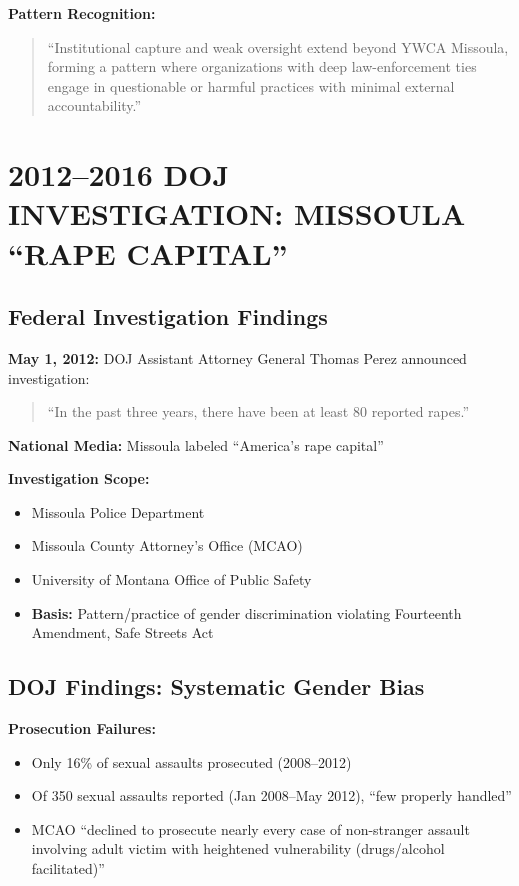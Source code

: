 \documentclass[11pt,letterpaper]{article}
\begin{document}
\textbf{Pattern Recognition:}
\begin{quote}
``Institutional capture and weak oversight extend beyond YWCA Missoula, forming a pattern where organizations with deep law-enforcement ties engage in questionable or harmful practices with minimal external accountability.''
\end{quote}

\newpage

\section{2012--2016 DOJ INVESTIGATION: MISSOULA ``RAPE CAPITAL''}

\subsection{Federal Investigation Findings}

\textbf{May 1, 2012:} DOJ Assistant Attorney General Thomas Perez announced investigation:
\begin{quote}
``In the past three years, there have been at least 80 reported rapes.''
\end{quote}

\textbf{National Media:} Missoula labeled ``America's rape capital''

\textbf{Investigation Scope:}
\begin{itemize}[leftmargin=*]
\item Missoula Police Department
\item Missoula County Attorney's Office (MCAO)
\item University of Montana Office of Public Safety
\item \textbf{Basis:} Pattern/practice of gender discrimination violating Fourteenth Amendment, Safe Streets Act
\end{itemize}

\subsection{DOJ Findings: Systematic Gender Bias}

\textbf{Prosecution Failures:}
\begin{itemize}[leftmargin=*]
\item Only 16\% of sexual assaults prosecuted (2008--2012)
\item Of 350 sexual assaults reported (Jan 2008--May 2012), ``few properly handled''
\item MCAO ``declined to prosecute nearly every case of non-stranger assault involving adult victim with heightened vulnerability (drugs/alcohol facilitated)''
\end{itemize}
\end{document}
